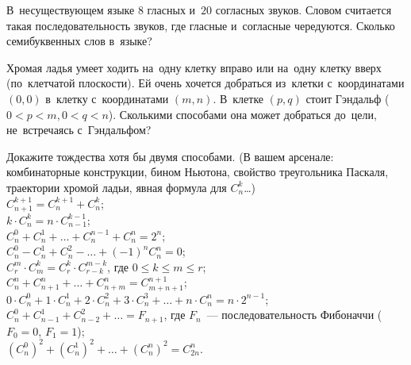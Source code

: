 


\begin{problems}

\item
В~несуществующем языке $8$ гласных и~$20$ согласных звуков.
Словом считается такая последовательность звуков, где гласные и~согласные
чередуются.
Сколько семибуквенных слов в~языке?

\item
Хромая ладья умеет ходить на~одну клетку вправо или на~одну клетку вверх
(по~клетчатой плоскости).
Ей очень хочется добраться из~клетки с~координатами $(0, 0)$ в~клетку
с~координатами $(m, n)$.
В~клетке $(p, q)$ стоит Гэндальф ($0 < p < m, 0 < q < n$).
Сколькими способами она может добраться до~цели, не~встречаясь с~Гэндальфом?

\item
Докажите тождества хотя бы двумя способами.
(В вашем арсенале:
комбинаторные конструкции, бином Ньютона, свойство треугольника Паскаля,
траектории хромой ладьи, явная формула для $C_{n}^{k}$\ldots)
\\[0.3ex]
\subproblem
$C_{n+1}^{k+1} = C_{n}^{k+1} + C_{n}^{k}$;
\\[0.5ex]
\subproblem
$k \cdot C_{n}^{k} = n \cdot C_{n-1}^{k-1}$;
\\[0.5ex]
\subproblem
$C_{n}^{0} + C_{n}^{1} + \ldots + C_{n}^{n-1} + C_{n}^{n} = 2^{n}$;
\\[0.5ex]
\subproblem
$C_{n}^{0} - C_{n}^{1} + C_{n}^{2} - \ldots + (-1)^n C_{n}^{n} = 0$;
\\[0.5ex]
\subproblem
$C_{r}^{m} \cdot C_{m}^{k} = C_{r}^{k} \cdot C_{r-k}^{m-k}$,
где $0 \leq k \leq m \leq r$;
\\[0.5ex]
\subproblem
$C_{n}^{n} + C_{n+1}^{n} + \ldots + C_{n+m}^{n} = C_{m+n+1}^{n+1}$;
\\[0.5ex]
\subproblem
\(
    0 \cdot C_{n}^{0} + 1 \cdot C_{n}^{1} + 2 \cdot C_{n}^{2} +
    3 \cdot C_{n}^{3} + \ldots + n \cdot C_{n}^{n}
=
    n \cdot 2^{n-1}
\);
\\[0.5ex]
\subproblem
$C_{n}^{0} + C_{n-1}^{1} + C_{n-2}^{2} + \ldots = F_{n+1}$,
где $F_{n}$~--- последовательность Фибоначчи ($F_{0} = 0$, $F_{1} = 1$);
\\[0.5ex]
\subproblem
$(C_{n}^{0})^2 + (C_{n}^{1})^2 + \ldots + (C_{n}^{n})^2 = C_{2n}^{n}$.


\end{problems}
